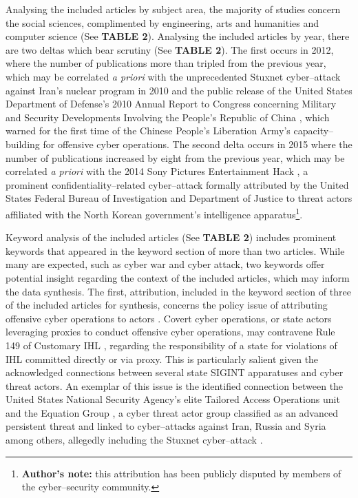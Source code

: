 \documentclass[british]{article}
\begin{document}
Analysing the included articles by subject area, the majority of studies
concern the social sciences, complimented by engineering, arts and
humanities and computer science (See \textbf{TABLE 2}). Analysing
the included articles by year, there are two deltas which bear scrutiny
(See \textbf{TABLE 2}). The first occurs in 2012, where the number
of publications more than tripled from the previous year, which may
be correlated \textit{a priori} with the unprecedented Stuxnet cyber--attack
against Iran's nuclear program in 2010 \cite{langner2011stuxnet}
and the public release of the United States Department of Defense's
2010 Annual Report to Congress concerning Military and Security Developments
Involving the People's Republic of China \cite{gates2010military},
which warned for the first time of the Chinese People's Liberation
Army's capacity--building for offensive cyber operations. The second
delta occurs in 2015 where the number of publications increased by
eight from the previous year, which may be correlated \textit{a priori}
with the 2014 Sony Pictures Entertainment Hack \cite{haggard2015north},
a prominent confidentiality--related cyber--attack formally attributed
by the United States Federal Bureau of Investigation and Department
of Justice to threat actors affiliated with the North Korean government's
intelligence apparatus\footnote{\textbf{Author's note:} this attribution has been publicly disputed
by members of the cyber--security community.}.

Keyword analysis of the included articles (See \textbf{TABLE 2}) includes
prominent keywords that appeared in the keyword section of more than
two articles. While many are expected, such as \textquotedbl cyber
war\textquotedbl{} and \textquotedbl cyber attack\textquotedbl , two
keywords offer potential insight regarding the context of the included
articles, which may inform the data synthesis. The first, \textquotedbl attribution\textquotedbl ,
included in the keyword section of three of the included articles
for synthesis, concerns the policy issue of attributing offensive
cyber operations to actors \cite{dipert2010ethics}. Covert cyber
operations, or state actors leveraging proxies to conduct offensive
cyber operations, may contravene Rule 149 of Customary IHL \cite{drmann2005customary},
regarding the responsibility of a state for violations of IHL committed
directly or via proxy. This is particularly salient given the acknowledged
connections between several state SIGINT apparatuses and cyber threat
actors. An exemplar of this issue is the identified connection between
the United States National Security Agency's elite Tailored Access
Operations unit \cite{loleski2019cold} and the Equation Group \cite{van2017impact},
a cyber threat actor group classified as an advanced persistent threat
\cite{alshamrani2019survey} and linked to cyber--attacks against
Iran, Russia and Syria among others, allegedly including the Stuxnet
cyber--attack \cite{langner2011stuxnet}. 
\end{document}
